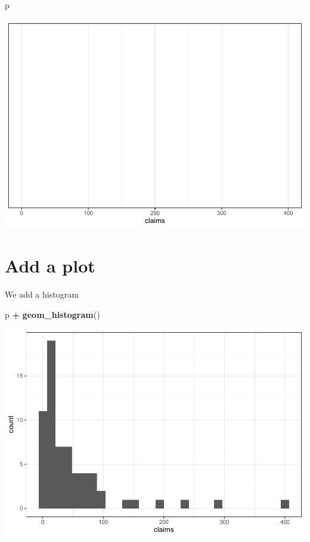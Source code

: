\documentclass[openany]{book}
\newenvironment{Shaded}{\begin{snugshade}}{\end{snugshade}}
\newcommand{\KeywordTok}[1]{\textcolor[rgb]{0.13,0.29,0.53}{\textbf{#1}}}
\newcommand{\NormalTok}[1]{#1}
\newcommand{\OperatorTok}[1]{\textcolor[rgb]{0.81,0.36,0.00}{\textbf{#1}}}
\newcommand{\StringTok}[1]{\textcolor[rgb]{0.31,0.60,0.02}{#1}}
\begin{document}
\begin{Shaded}
\begin{Highlighting}[]
\NormalTok{p}
\end{Highlighting}
\end{Shaded}

\includegraphics{04-visualization_files/figure-latex/unnamed-chunk-3-1.pdf}

\hypertarget{add-a-plot}{%
\section{Add a plot}\label{add-a-plot}}

We add a histogram

\begin{Shaded}
\begin{Highlighting}[]
\NormalTok{p }\OperatorTok{+}\StringTok{ }\KeywordTok{geom_histogram}\NormalTok{()}
\end{Highlighting}
\end{Shaded}

\includegraphics{04-visualization_files/figure-latex/unnamed-chunk-4-1.pdf}
\end{document}
